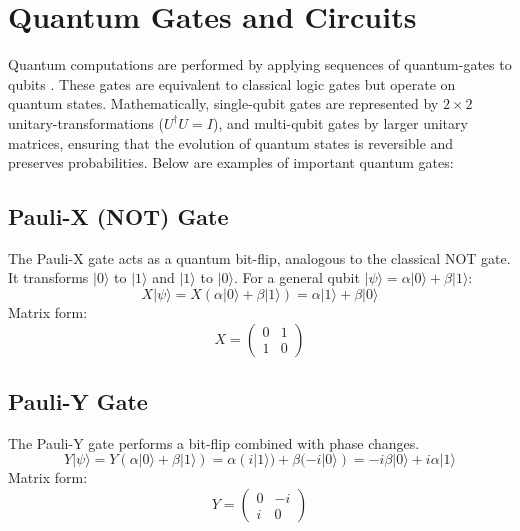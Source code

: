 \section{Quantum Gates and Circuits}\label{sec:quantum_gates}

Quantum computations are performed by applying sequences of \glspl{quantum-gate} to \glspl{qubit} \parencite{wikipediaQuantumCircuit}. These gates are equivalent to classical logic gates but operate on quantum states. Mathematically, single-qubit gates are represented by $2 \times 2$ \glspl{unitary-transformation} ($U^\dagger U = I$), and multi-qubit gates by larger unitary matrices, ensuring that the evolution of quantum states is reversible and preserves probabilities. Below are examples of important quantum gates:

\subsection*{Pauli-X (NOT) Gate}
The Pauli-X gate acts as a quantum bit-flip, analogous to the classical NOT gate. It transforms $|0\rangle$ to $|1\rangle$ and $|1\rangle$ to $|0\rangle$. For a general qubit $|\psi\rangle = \alpha|0\rangle + \beta|1\rangle$:
\begin{equation*}
    X|\psi\rangle = X(\alpha|0\rangle + \beta|1\rangle) = \alpha|1\rangle + \beta|0\rangle
\end{equation*}
Matrix form:
\begin{equation*}
    X = \begin{pmatrix} 0 & 1 \\ 1 & 0 \end{pmatrix}
\end{equation*}

\subsection*{Pauli-Y Gate}
The Pauli-Y gate performs a bit-flip combined with phase changes.
\begin{equation*}
    Y|\psi\rangle = Y(\alpha|0\rangle + \beta|1\rangle) = \alpha(i|1\rangle) + \beta(-i|0\rangle) = -i\beta|0\rangle + i\alpha|1\rangle
\end{equation*}
Matrix form:
\begin{equation*}
    Y = \begin{pmatrix} 0 & -i \\ i & 0 \end{pmatrix}
\end{equation*}

